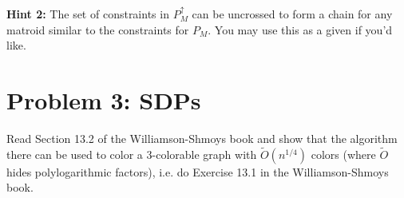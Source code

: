 \noindent\textbf{Hint 2:} The set of constraints in $P^\uparrow_M$ can be uncrossed to form a chain for any matroid similar to the constraints for $P_M$. You may use this as a given if you'd like.


\section{Problem 3: SDPs}

Read Section 13.2 of the Williamson-Shmoys book and show that the algorithm there can be used to color a 3-colorable graph with $\tilde{O}(n^{1/4})$ colors (where $\tilde{O}$ hides polylogarithmic factors), i.e. do Exercise 13.1 in the Williamson-Shmoys book. 

